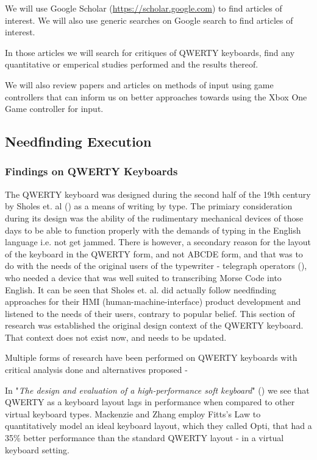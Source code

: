 \documentclass[
	letterpaper, %
]{jdf}
\begin{document}
We will use Google Scholar (\url{https://scholar.google.com}) to find articles of interest. We will also use generic searches on Google search to find articles of interest.

In those articles we will search for critiques of QWERTY keyboards, find any quantitative or emperical studies performed and the results thereof.

We will also review papers and articles on methods of input using game controllers that can inform us on better approaches towards using the Xbox One Game controller for input.

\subsection{Needfinding Execution}
\subsubsection{Findings on QWERTY Keyboards}
The QWERTY keyboard was designed during the second half of the 19th century by Sholes et. al (\cite{sholes_glidden_soule_1868}) as a means of writing by type. The primiary consideration during its design was the ability of the rudimentary mechanical devices of those days to be able to function properly with the demands of typing in the English language i.e. not get jammed. There is however, a secondary reason for the layout of the keyboard in the QWERTY form, and not ABCDE form, and that was to do with the needs of the original users of the typewriter - telegraph operators (\cite{stamp_2013}), who needed a device that was well suited to transcribing Morse Code into English. It can be seen that Sholes et. al. did actually follow needfinding approaches for their HMI (human-machine-interface) product development and listened to the needs of their users, contrary to popular belief. This section of research was established the original design context of the QWERTY keyboard. That context does not exist now, and needs to be updated.

Multiple forms of research have been performed on QWERTY keyboards with critical analysis done and alternatives proposed - 

In "\textit{The design and evaluation of a high-performance soft keyboard}" (\cite{mackenzie_zhang_1999}) we see that QWERTY as a keyboard layout lags in performance when compared to other virtual keyboard types. Mackenzie and Zhang employ Fitts's Law to quantitatively model an ideal keyboard layout, which they called Opti, that had a 35\% better performance than the standard QWERTY layout - in a virtual keyboard setting.
\end{document}
